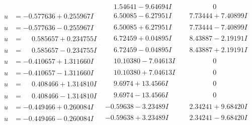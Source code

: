 \documentclass[1p]{elsarticle_modified}
\theoremstyle{definition}
\begin{document}
$$\begin{array}{c|c|c}
 & \phantom{-}1.54641 - 9.64694 I & \phantom{-0.000000 } 0 \\ \hline\begin{aligned}
u &= -0.577636 + 0.255967 I\end{aligned}
 & \phantom{-}6.50085 - 6.27951 I & \phantom{-}7.73444 + 7.40899 I \\ \hline\begin{aligned}
u &= -0.577636 - 0.255967 I\end{aligned}
 & \phantom{-}6.50085 + 6.27951 I & \phantom{-}7.73444 - 7.40899 I \\ \hline\begin{aligned}
u &= \phantom{-}0.585657 + 0.234755 I\end{aligned}
 & \phantom{-}6.72459 + 0.04895 I & \phantom{-}8.43887 - 2.19191 I \\ \hline\begin{aligned}
u &= \phantom{-}0.585657 - 0.234755 I\end{aligned}
 & \phantom{-}6.72459 - 0.04895 I & \phantom{-}8.43887 + 2.19191 I \\ \hline\begin{aligned}
u &= -0.410657 + 1.311660 I\end{aligned}
 & \phantom{-}10.10380 - 7.04613 I & \phantom{-0.000000 } 0 \\ \hline\begin{aligned}
u &= -0.410657 - 1.311660 I\end{aligned}
 & \phantom{-}10.10380 + 7.04613 I & \phantom{-0.000000 } 0 \\ \hline\begin{aligned}
u &= \phantom{-}0.408466 + 1.314810 I\end{aligned}
 & \phantom{-}9.6974 + 13.4566 I & \phantom{-0.000000 } 0 \\ \hline\begin{aligned}
u &= \phantom{-}0.408466 - 1.314810 I\end{aligned}
 & \phantom{-}9.6974 - 13.4566 I & \phantom{-0.000000 } 0 \\ \hline\begin{aligned}
u &= -0.449466 + 0.260084 I\end{aligned}
 & -0.59638 - 3.23489 I & \phantom{-}2.34241 + 9.68420 I \\ \hline\begin{aligned}
u &= -0.449466 - 0.260084 I\end{aligned}
 & -0.59638 + 3.23489 I & \phantom{-}2.34241 - 9.68420 I \\ \hline\begin{aligned}

\end{aligned}
\end{array}$$
\end{document}
